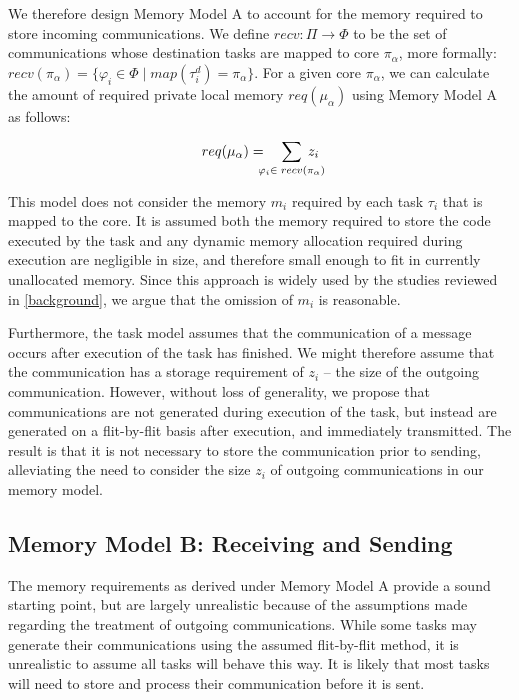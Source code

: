 \documentclass[conference]{IEEEtran}
\begin{document}
We therefore design Memory Model A to account for the memory required to store incoming communications. We define $recv : \Pi \rightarrow \Phi$ to be the set of communications whose destination tasks are mapped to core $\pi_\alpha$, more formally: $recv(\pi_\alpha) = \lbrace \varphi_i \in \Phi \mid map(\tau^d_i) = \pi_\alpha \rbrace$. For a given core $\pi_\alpha$, we can calculate the amount of required private local memory $req(\mu_\alpha)$ using Memory Model A as follows:

	\begin{equation}
		req(\mu_\alpha) =
		\phantom{...} \sum_{\mathclap{\varphi_i \in \phantom{.}recv(\pi_\alpha)}}\phantom{.} z_i
	\end{equation}
	
This model does not consider the memory $m_i$ required by each task $\tau_i$ that is mapped to the core. It is assumed both the memory required to store the code executed by the task and any dynamic memory allocation required during execution are negligible in size, and therefore small enough to fit in currently unallocated memory. Since this approach is widely used by the studies reviewed in \ref{background}, we argue that the omission of $m_i$ is reasonable.
	
Furthermore, the task model assumes that the communication of a message occurs after execution of the task has finished. We might therefore assume that the communication has a storage requirement of $z_i$ -- the size of the outgoing communication. However, without loss of generality, we propose that communications are not generated during execution of the task, but instead are generated on a flit-by-flit basis after execution, and immediately transmitted. The result is that it is not necessary to store the communication prior to sending, alleviating the need to consider the size $z_i$ of outgoing communications in our memory model.
		
\subsection{Memory Model B: Receiving and Sending}\label{memory_model_b}

The memory requirements as derived under Memory Model A provide a sound starting point, but are largely unrealistic because of the assumptions made regarding the treatment of outgoing communications. While some tasks may generate their communications using the assumed flit-by-flit method, it is unrealistic to assume all tasks will behave this way. It is likely that most tasks will need to store and process their communication before it is sent.
	
\end{document}
